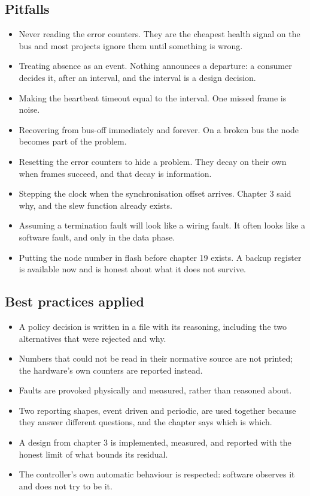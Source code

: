 \subsection*{Pitfalls}

\begin{itemize}
\item Never reading the error counters. They are the cheapest health signal on
the bus and most projects ignore them until something is wrong.
\item Treating absence as an event. Nothing announces a departure: a consumer
decides it, after an interval, and the interval is a design decision.
\item Making the heartbeat timeout equal to the interval. One missed frame is
noise.
\item Recovering from bus-off immediately and forever. On a broken bus the node
becomes part of the problem.
\item Resetting the error counters to hide a problem. They decay on their own
when frames succeed, and that decay is information.
\item Stepping the clock when the synchronisation offset arrives. Chapter 3 said
why, and the slew function already exists.
\item Assuming a termination fault will look like a wiring fault. It often looks
like a software fault, and only in the data phase.
\item Putting the node number in flash before chapter 19 exists. A backup
register is available now and is honest about what it does not survive.
\end{itemize}

\subsection*{Best practices applied}

\begin{itemize}
\item A policy decision is written in a file with its reasoning, including the
two alternatives that were rejected and why.
\item Numbers that could not be read in their normative source are not printed;
the hardware's own counters are reported instead.
\item Faults are provoked physically and measured, rather than reasoned about.
\item Two reporting shapes, event driven and periodic, are used together because
they answer different questions, and the chapter says which is which.
\item A design from chapter 3 is implemented, measured, and reported with the
honest limit of what bounds its residual.
\item The controller's own automatic behaviour is respected: software observes
it and does not try to be it.
\end{itemize}

